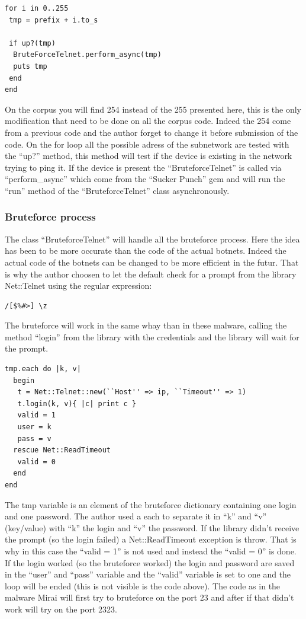 \documentclass{report}
\begin{document}
\lstset{language=Ruby}
\begin{lstlisting}[frame=single]
for i in 0..255
 tmp = prefix + i.to_s

 if up?(tmp)
  BruteForceTelnet.perform_async(tmp)
  puts tmp
 end
end
\end{lstlisting}
On the corpus you will find 254 instead of the 255 presented here, this is the only modification that need to be done on all the corpus code. Indeed the 254 come from a previous code and the author forget to change it before submission of the code.\newline
On the for loop all the possible adress of the subnetwork are tested with the ``up?'' method, this method will test if the device is existing in the network trying to ping it. If the device is present the ``BruteforceTelnet'' is called via ``perform\_async'' which come from the ``Sucker Punch'' \autocite{suckerpunch} gem and will run the ``run'' method of the ``BruteforceTelnet'' class asynchronously.

\subsubsection{Bruteforce process}
The class ``BruteforceTelnet'' will handle all the bruteforce process. Here the idea has been to be more occurate than the code of the actual botnets. Indeed the actual code of the botnets can be changed to be more efficient in the futur. That is why the author choosen to let the default check for a prompt from the library Net::Telnet \autocite{nettelnet} using the regular expression:
\begin{Verbatim}[frame=single]
/[$%#>] \z
\end{Verbatim}
The bruteforce will work in the same whay than in these malware, calling the method ``login'' from the library with the credentials and the library will wait for the prompt.
\lstset{language=Ruby}
\begin{lstlisting}[frame=single]
tmp.each do |k, v|
  begin
   t = Net::Telnet::new(``Host'' => ip, ``Timeout'' => 1)
   t.login(k, v){ |c| print c }
   valid = 1
   user = k
   pass = v
  rescue Net::ReadTimeout
   valid = 0
  end
end
\end{lstlisting}
The tmp variable is an element of the bruteforce dictionary containing one login and one password. The author used a each to separate it in ``k'' and ``v'' (key/value) with ``k'' the login and ``v'' the password. If the library didn't receive the prompt (so the login failed) a Net::ReadTimeout exception is throw. That is why in this case the ``valid = 1'' is not used and instead the ``valid = 0'' is done. If the login worked (so the bruteforce worked) the login and password are saved in the ``user'' and ``pass'' variable and the ``valid'' variable is set to one and the loop will be ended (this is not visible is the code above).\newline
The code as in the malware Mirai will first try to bruteforce on the port 23 and after if that didn't work will try on the port 2323.
\end{document}
